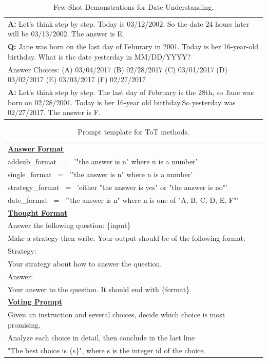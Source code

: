 \documentclass[11pt]{article}
\begin{document}
\begin{table}[ht]
\begin{tabularx}{\textwidth}{X}
    \textbf{A: }Let's think step by step. Today is 03/12/2002. So the date 24 hours later will be 03/13/2002. The answer is E.\\
    \hdashline
    \textbf{Q: }Jane was born on the last day of Feburary in 2001. Today is her 16-year-old birthday. What is the date yesterday in MM/DD/YYYY? \\
    Answer Choices: (A) 03/04/2017 (B) 02/28/2017 (C) 03/01/2017 (D) 03/02/2017 (E) 03/03/2017 (F) 02/27/2017 \\
    \textbf{A: }Let's think step by step. The last day of February is the 28th, so Jane was born on 02/28/2001. Today is her 16-year old birthday.So yesterday was 02/27/2017. The answer is F.\\
    \bottomrule
    \end{tabularx}
    \caption{Few-Shot Demonstrations for Date Understanding.}
    \label{tab:fs_date}
\end{table}


\begin{table}[ht]
    \centering
    \begin{tabularx}{\textwidth}{l}
    \toprule 
    \underline{\textbf{Answer Format}} \\
    addsub\_format ~=~ '"the answer is n" where n is a number' \\
    single\_format ~=~ '"the answer is n" where n is a number' \\
    strategy\_format ~=~ 'either "the answer is yes" or "the answer is no"' \\
    date\_format ~=~ '"the answer is n" where n is one of "A, B, C, D, E, F"' \\
    \underline{\textbf{Thought Format}} \\
    Answer the following question: \{input\} \\
    Make a strategy then write. Your output should be of the following format: \\
    Strategy: \\
    Your strategy about how to answer the question. \\
    Answer: \\
    Your answer to the question. It should end with \{format\}. \\
    \underline{\textbf{Voting Prompt}} \\
    Given an instruction and several choices, decide which choice is most promising. \\
    Analyze each choice in detail, then conclude in the last line \\"The best choice is \{s\}", where s is the integer id of the choice. \\
    \bottomrule
    \end{tabularx}
    \caption{Prompt template for ToT methods.}
    \label{tab:tot_prompt}
\end{table}
\end{document}
